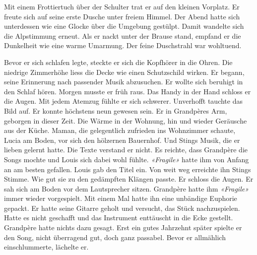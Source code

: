 Mit einem Frottiertuch über der Schulter trat er auf den kleinen Vorplatz. 
Er freute sich auf seine erste Dusche unter freiem Himmel.
Der Abend hatte sich unterdessen wie eine Glocke über die Umgebung
gestülpt. Damit wandelte sich die Alpstimmung erneut. Als er nackt unter der Brause stand, empfand er die Dunkelheit wie eine warme Umarmung. Der feine Duschstrahl war wohltuend.

Bevor er sich schlafen legte, steckte er sich
die Kopfhörer in die Ohren.
Die niedrige Zimmerhöhe liess die Decke wie einen Schutzschild wirken. Er begann, seine 
Erinnerung nach passender Musik abzusuchen. Er wollte sich beruhigt in
den Schlaf hören. Morgen musste er früh raus. Das Handy in der Hand schloss er die Augen. Mit jedem
Atemzug fühlte er sich schwerer. Unverhofft tauchte das Bild auf. Er konnte höchstens neun gewesen sein. Er in
Grandpères Arm, geborgen in dieser Zeit.  Die Wärme in der Wohnung, hin
und wieder Geräusche aus der Küche. Maman, die gelegentlich zufrieden ins
Wohnzimmer schaute, Lucia am Boden, 
vor sich den hölzernen Bauernhof. Und Stings Musik, die er lieben
gelernt hatte. Die Texte verstand er nicht. Es reichte, dass Grandpère
die Songs mochte und Louis sich dabei wohl fühlte. 
\emph{«Fragile»}  hatte ihm von Anfang an am besten gefallen.
Louis gab den Titel ein. 
Von weit weg erreichte ihn Stings Stimme. Wie gut sie zu den gedämpften Klängen passte. Er schloss die Augen. Er sah sich am Boden vor dem Lautsprecher sitzen. Grandpère hatte ihm \emph{«Fragile»} immer wieder vorgespielt. Mit einem Mal hatte ihn eine unbändige Euphorie gepackt. Er hatte seine Gitarre geholt und versucht, das Stück nachzuspielen. Hatte es nicht geschafft und das Instrument enttäuscht in die Ecke gestellt. Grandpère hatte nichts dazu  gesagt. Erst ein gutes Jahrzehnt später spielte er den Song, nicht überragend gut, doch ganz  passabel. Bevor er allmählich einschlummerte, lächelte er.

